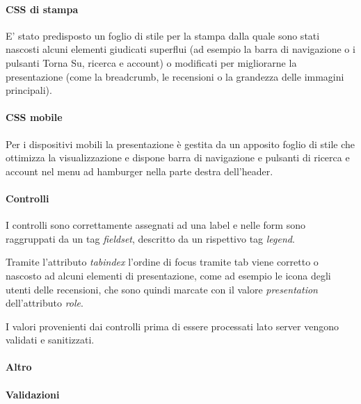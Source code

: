 \paragraph{CSS di stampa}
E' stato predisposto un foglio di stile per la stampa dalla quale sono stati nascosti alcuni elementi giudicati superflui (ad esempio la barra di navigazione o i pulsanti Torna Su, ricerca e account) o modificati per migliorarne la presentazione (come la breadcrumb, le recensioni o la grandezza delle immagini principali).

\paragraph{CSS mobile}
Per i dispositivi mobili la presentazione è gestita da un apposito foglio di stile che ottimizza la visualizzazione e dispone barra di navigazione e pulsanti di ricerca e account nel menu ad hamburger nella parte destra dell'header.

\paragraph{Controlli}
I controlli sono correttamente assegnati ad una label e nelle form sono raggruppati da un tag \textit{fieldset}, descritto da un rispettivo tag \textit{legend}.


Tramite l'attributo \textit{tabindex} l'ordine di focus tramite tab viene corretto o nascosto ad alcuni elementi di presentazione, come ad esempio le icona degli utenti delle recensioni, che sono quindi marcate con il valore \textit{presentation} dell'attributo \textit{role}.


I valori provenienti dai controlli prima di essere processati lato server vengono validati e sanitizzati.

\paragraph{Altro}

\paragraph{Validazioni}

